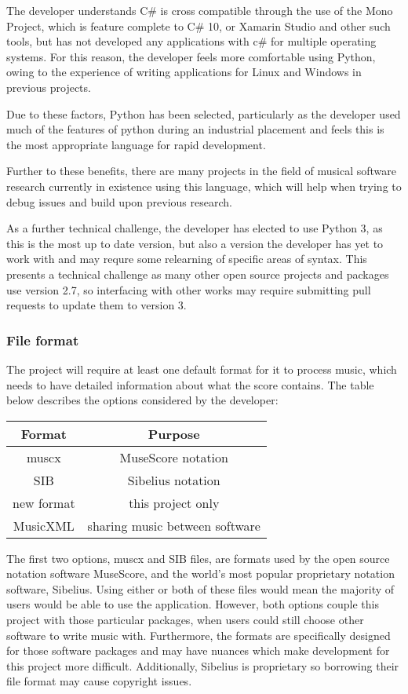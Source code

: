 The developer understands C\# is cross compatible through the use of the Mono Project, which is feature complete to C\# 10\parencite{MonoDev}, or Xamarin Studio and other such tools, but has not developed any applications with c\# for multiple operating systems. For this reason, the developer feels more comfortable using Python, owing to the experience of writing applications for Linux and Windows in previous projects. 

Due to these factors, Python has been selected, particularly as the developer used much of the features of python during an industrial placement and feels this is the most appropriate language for rapid development.

Further to these benefits, there are many projects in the field of musical software research currently in existence using this language, \parencite{pmus} which will help when trying to debug issues and build upon previous research.

As a further technical challenge, the developer has elected to use Python 3, as this is the most up to date version, but also a version the developer has yet to work with and may requre some relearning of specific areas of syntax. This presents a technical challenge as many other open source projects and packages use version 2.7, so interfacing with other works may require submitting pull requests to update them to version 3.

\subsubsection{File format}
The project will require at least one default format for it to process music, which needs to have detailed information about what the score contains. The table below describes the options considered by the developer:

\begin{center}
\begin{tabular}{| c | c | } \hline
  {Format} & {Purpose} \\ \hline
  muscx & MuseScore notation \\ \hline
  SIB & Sibelius notation \\ \hline
  new format & this project only \\ \hline
  MusicXML & sharing music between software \\ \hline
\end{tabular}
\end{center}
The first two options, muscx and SIB files, are formats used by the open source notation software MuseScore\parencite{MuseTour}, and the world's most popular proprietary notation software, Sibelius\parencite{avid}. Using either or both of these files would mean the majority of users would be able to use the application. 
However, both options couple this project with those particular packages, when users could still choose other software to write music with. Furthermore, the formats are specifically designed for those software packages and may have nuances which make development for this project more difficult. Additionally, Sibelius is proprietary so borrowing their file format may cause copyright issues.

